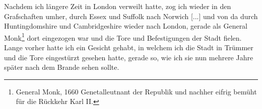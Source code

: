 Nachdem ich längere Zeit in London verweilt hatte, zog ich
wieder in den Grafschaften umher, durch Essex 
und Suffolk nach Norwich [...] und von 
da durch Huntingdomshire und 
Cambridgeshire wieder nach London, 
gerade als General Monk\footnote{General Monk, 1660 
Genetalleutnant der Republik und nachher eifrig
bemüht für die Rückkehr Karl II.} dort
eingezogen war und die Tore und Befestigungen der Stadt
fielen. Lange vorher hatte ich 
ein Gesicht gehabt, in welchem
ich die Stadt in Trümmer und die Tore eingestürzt gesehen
hatte, gerade so, wie ich sie nun mehrere Jahre später nach dem
Brande sehen sollte.